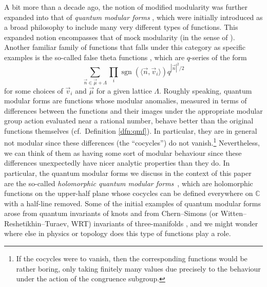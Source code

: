 \documentclass[pdftex]{sigma}
\theoremstyle{definition}
\numberwithin{equation}{section}
\begin{document}
A bit more than a decade ago, the notion of modified modularity was further expanded into that of {\it quantum modular forms} \cite{zagier2010quantum}, which were initially introduced as a broad philosophy to include many very different types of functions. This expanded notion encompasses that of mock modularity (in the sense of \cite{10.2307/procamermathsoci.144.6.2337}). Another familiar family of functions that falls under this category as specific examples is the so-called false theta functions \cite{zagier2010quantum}, which are $q$-series of the form
\[\sum_{\vec n\in \vec\mu + \Lambda} \prod_{i}\operatorname{sgn}(\langle \vec n, \vec v_i\rangle) q^{|\vec n|^2/2}\]
for some choices of $\vec v_i$ and $\vec\mu$ for a given lattice $\Lambda$. Roughly speaking, quantum modular forms are functions whose modular anomalies, measured in terms of differences between the functions and their images under the appropriate modular group action evaluated near a rational number, behave better than the original functions themselves (cf.\ Definition \ref{dfn:qmf}). In particular, they are in general not modular since these differences (the ``cocycles'') do not vanish.\footnote{If the cocycles were to vanish, then the corresponding functions would be rather boring, only taking finitely many values due precisely to the behaviour under the action of the congruence subgroup.}
Nevertheless, we can think of them as having some sort of modular behaviour since these differences unexpectedly have nicer analytic properties than they do. In particular, the quantum modular forms we discuss in the context of this paper are the so-called {\it holomorphic quantum modular forms}~\cite{ZagierHausdorf}, which are holomorphic functions on the upper-half plane whose cocycles can be defined everywhere on ${\mathbb C}$ with a half-line removed. Some of the initial examples of quantum modular forms arose from quantum invariants of knots and from Chern--Simons (or Witten--Reshetikhin--Turaev, WRT) invariants of three-manifolds \cite{lawrence1999modular}, and we might wonder where else in physics or topology does this type of functions play a role.
\end{document}
